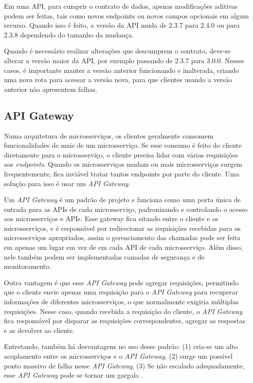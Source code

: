 Em uma API, para cumprir o contrato de dados, apenas modificações aditivas podem ser feitas, tais como novos endpoints ou novos campos opcionais em algum recurso. Quando isso é feito, a versão da API muda de 2.3.7 para 2.4.0 ou para 2.3.8 dependendo do tamanho da mudança.

Quando é necessário realizar alterações que descumprem o contrato, deve-se alterar a versão maior da API, por exemplo passando de 2.3.7 para 3.0.0. Nesses casos, é importante manter a versão anterior funcionando e inalterada, criando uma nova rota para acessar a versão nova, para que clientes usando a versão anterior não apresentem falhas.

\subsection{API Gateway}\label{boas-praticas-api-gateway}
Numa arquitetura de microsserviços, os clientes geralmente consomem funcionalidades de mais de um microsserviço. Se esse consumo é feito do cliente diretamente para o microsserviço, o cliente precisa lidar com várias requisições aos \emph{endpoints}. Quando os microsserviços mudam ou mais microsserviços surgem frequentemente, fica inviável tratar tantos endpoints por parte do cliente. Uma solução para isso é usar um \emph{API Gateway}. 

Um \emph{API Gateway} é um padrão de projeto e funciona como uma porta única de entrada para as APIs de cada microsserviço, padronizando e controlando o acesso aos microsserviços e APIs. Esse gateway fica situado entre o cliente e os microsserviços, e é responsável por redirecionar as requisições recebidas para os microsserviços apropriados, assim o gerenciamento das chamadas pode ser feita em apenas um lugar em vez de em cada API de cada microsserviço. Além disso, nele também podem ser implementadas camadas de segurança e de monitoramento.

Outra vantagem é que esse \emph{API Gateway} pode agregar requisições, permitindo que o cliente envie apenas uma requisição para o \emph{API Gateway} para recuperar informações de diferentes microsserviços, o que normalmente exigiria múltiplas requisições. Nesse caso, quando recebida a requisição do cliente, o \emph{API Gateway} fica responsável por disparar as requisições correspondentes, agregar as respostas e as devolver ao cliente.

Entretando, também há desvantagens no uso desse padrão: (1) cria-se um alto acoplamento entre os microsserviços e o \emph{API Gateway}, (2) surge um possível ponto massivo de falha nesse \emph{API Gateway}, (3) Se não escalado adequadamente, esse \emph{API Gateway} pode se tornar um gargalo \cite{microsoft-api-gateway}.

